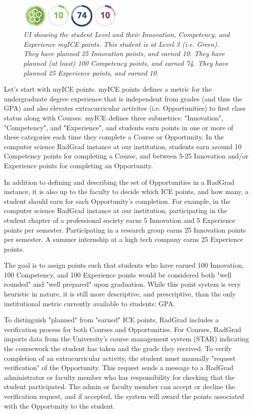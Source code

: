 \documentclass[acmsmall]{acmart}
\begin{document}
\begin{figure}[t]
\centering
\includegraphics[width=2in]{images/ice-pane.eps}
\caption{\em UI showing the student Level and their Innovation, Competency, and Experience myICE points. This student is at Level 3 (i.e. Green). They have planned 25 Innovation points, and earned 10. They have planned (at least) 100 Competency points, and earned 74. They have planned 25 Experience points, and earned 10.  }
\label{fig:ice}
\end{figure}

Let's start with myICE points.  myICE points defines a metric for the undergraduate degree experience that is independent from grades (and thus the GPA) and also elevates extracurricular activites (i.e. Opportunities) to first class status along with Courses. myICE defines three submetrics: "Innovation", "Competency", and "Experience", and students earn points in one or more of these categories each time they complete a Course or Opportunity. In the computer science RadGrad instance at our institution, students earn around 10 Competency points for completing a Course, and between 5-25 Innovation and/or Experience points for completing an Opportunity.

In addition to defining and describing the set of Opportunities in a RadGrad instance, it is also up to the faculty to decide which ICE points, and how many, a student should earn for each Opportunity's completion. For example, in the computer science RadGrad instance at our institution, participating in the student chapter of a professional society earns 5 Innovation and 5 Experience points per semester.  Participating in a research group earns 25 Innovation points per semester.  A summer internship at a high tech company earns 25 Experience points.

The goal is to assign points such that students who have earned 100 Innovation, 100 Competency, and 100 Experience points would be considered both "well rounded" and "well prepared" upon graduation.  While this point system is very heuristic in nature, it is still more descriptive, and prescriptive, than the only institutional metric currently available to students: GPA.

To distinguish "planned" from "earned" ICE points, RadGrad includes a verification process for both Courses and Opportunities. For Courses, RadGrad imports data from the University's course management system (STAR) indicating the coursework the student has taken and the grade they received.  To verify completion of an extracurricular activity, the student must manually "request verification" of the Opportunity.  This request sends a message to a RadGrad administrator or faculty member who has responsibility for checking that the student participated. The admin or faculty member can accept or decline the verification request, and if accepted, the system will award the points associated with the Opportunity to the student.
\end{document}
